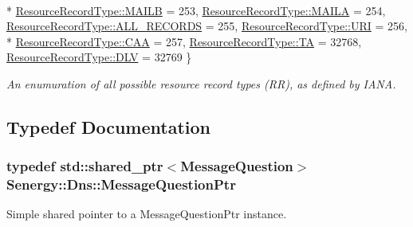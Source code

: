 \begin{DoxyCompactItemize}
\\*
\hyperlink{namespace_senergy_1_1_dns_a590bfd748c955364770f5ce358d9dfe0ae599722792c31154f99048e56b9cf384}{Resource\-Record\-Type\-::\-M\-A\-I\-L\-B} = 253, 
\hyperlink{namespace_senergy_1_1_dns_a590bfd748c955364770f5ce358d9dfe0a59fe37d7dd88b5a7c76146d14db1331f}{Resource\-Record\-Type\-::\-M\-A\-I\-L\-A} = 254, 
\hyperlink{namespace_senergy_1_1_dns_a590bfd748c955364770f5ce358d9dfe0a8261d4e71736b8ae72eae60ff8e18191}{Resource\-Record\-Type\-::\-A\-L\-L\-\_\-\-R\-E\-C\-O\-R\-D\-S} = 255, 
\hyperlink{namespace_senergy_1_1_dns_a590bfd748c955364770f5ce358d9dfe0a8447306210a0972ac94b7d774799df1a}{Resource\-Record\-Type\-::\-U\-R\-I} = 256, 
\\*
\hyperlink{namespace_senergy_1_1_dns_a590bfd748c955364770f5ce358d9dfe0ad7ff895c2bd9c10f958833aeb0289ad4}{Resource\-Record\-Type\-::\-C\-A\-A} = 257, 
\hyperlink{namespace_senergy_1_1_dns_a590bfd748c955364770f5ce358d9dfe0a890a10788493e3d572586e991cd43543}{Resource\-Record\-Type\-::\-T\-A} = 32768, 
\hyperlink{namespace_senergy_1_1_dns_a590bfd748c955364770f5ce358d9dfe0aede320f6102f02f5903553674ed8a3f5}{Resource\-Record\-Type\-::\-D\-L\-V} = 32769
 \}
\begin{DoxyCompactList}\small\item\em An enumuration of all possible resource record types (R\-R), as defined by I\-A\-N\-A. \end{DoxyCompactList}\end{DoxyCompactItemize}


\subsection{Typedef Documentation}
\hypertarget{namespace_senergy_1_1_dns_a425a2a6f3b5c18973c524a99bdfa4ef0}{
\subsubsection[{Message\-Question\-Ptr}]{\setlength{\rightskip}{0pt plus 5cm}typedef std\-::shared\-\_\-ptr$<${\bf Message\-Question}$>$ {\bf Senergy\-::\-Dns\-::\-Message\-Question\-Ptr}}}\label{namespace_senergy_1_1_dns_a425a2a6f3b5c18973c524a99bdfa4ef0}


Simple shared pointer to a Message\-Question\-Ptr instance. 



